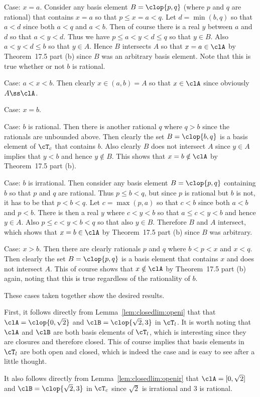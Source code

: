 {{    Case: $x = a$.
    Consider any basis element $B = \clop{p,q}$ (where $p$ and $q$ are rational) that contains $x = a$ so that $p \leq x = a < q$.
    Let $d = \min(b,q)$ so that $a < d$ since both $a < q$ and $a < b$.
    Then of course there is a real $y$ between $a$ and $d$ so that $a < y < d$.
    Thus we have $p \leq a < y < d \leq q$ so that $y \in B$.
    Also $a < y < d \leq b$ so that $y \in A$.
    Hence $B$ intersects $A$ so that $x = a \in \clA$ by Theorem~17.5 part (b) since $B$ was an arbitrary basis element.
    Note that this is true whether or not $b$ is rational.

    Case: $a < x < b$.
    Then clearly $x \in (a,b) = A$ so that $x \in \clA$ since obviously $A \ss \clA$.

    Case: $x = b$.
    \begin{indpar}
      Case: $b$ is rational.
      Then there is another rational $q$ where $q > b$ since the rationals are unbounded above.
      Then clearly the set $B = \clop{b, q}$ is a basis element of $\cT_c$ that contains $b$.
      Also clearly $B$ does not intersect $A$ since $y \in A$ implies that $y < b$ and hence $y \notin B$.
      This shows that $x = b \notin \clA$ by Theorem~17.5 part (b).

      Case: $b$ is irrational.
      Then consider any basis element $B = \clop{p,q}$ containing $b$ so that $p$ and $q$ are rational.
      Thus $p \leq b < q$, but since $p$ is rational but $b$ is not, it has to be that $p < b < q$.
      Let $c = \max(p,a)$ so that $c < b$ since both $a < b$ and $p < b$.
      There is then a real $y$ where $c < y < b$ so that $a \leq c < y < b$ and hence $y \in A$.
      Also $p \leq c < y < b < q$ so that also $y \in B$.
      Therefore $B$ and $A$ intersect, which shows that $x = b \in \clA$ by Theorem~17.5 part (b) since $B$ was arbitrary.
    \end{indpar}

    Case: $x > b$.
    Then there are clearly rationals $p$ and $q$ where $b < p < x$ and $x < q$.
    Then clearly the set $B = \clop{p,q}$ is a basis element that contains $x$ and does not intersect $A$.
    This of course shows that $x \notin \clA$ by Theorem~17.5 part (b) again, noting that this is true regardless of the rationality of $b$.

    These cases taken together show the desired results.
  }

  \mainprob
  
  First, it follows directly from Lemma~\ref{lem:closedlim:openi} that that $\clA = \clop{0, \sqrt{2}}$ and $\clB = \clop{\sqrt{2},3}$ in $\cT_l$.
  It is worth noting that $\clA$ and $\clB$ are both basis elements of $\cT_l$, which is interesting since they are closures and therefore closed.
  This of course implies that basis elements in $\cT_l$ are both open and closed, which is indeed the case and is easy to see after a little thought.
  
  It also follows directly from Lemma~\ref{lem:closedlim:openir} that $\clA = [0, \sqrt{2}]$ and $\clB = \clop{\sqrt{2}, 3}$ in $\cT_c$ since $\sqrt{2}$ is irrational and $3$ is rational.
}

